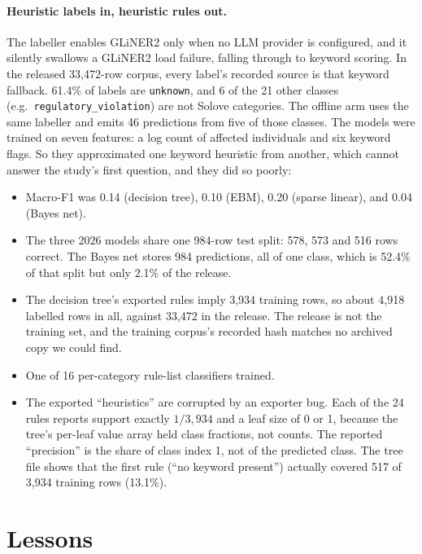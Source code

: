 \documentclass[10pt,twocolumn]{article}
\begin{document}
\paragraph{Heuristic labels in, heuristic rules out.} The labeller enables
GLiNER2 only when no LLM provider is configured, and it silently swallows a
GLiNER2 load failure, falling through to keyword scoring. In the released
33{,}472-row corpus, every label's recorded source is that keyword fallback.
61.4\% of labels are \texttt{unknown}, and 6 of the 21 other classes (e.g.\
\texttt{regulatory\_violation}) are not Solove categories. The offline arm uses
the same labeller and emits 46 predictions from five of those classes. The
models were trained on seven features: a log count of affected individuals and
six keyword flags. So they approximated one keyword heuristic from another,
which cannot answer the study's first question, and they did so poorly:
\begin{itemize}
  \item Macro-F1 was 0.14 (decision tree), 0.10 (EBM), 0.20 (sparse linear),
        and 0.04 (Bayes net).
  \item The three 2026 models share one 984-row test split: 578, 573 and 516
        rows correct. The Bayes net stores 984 predictions, all of one class,
        which is 52.4\% of that split but only 2.1\% of the release.
  \item The decision tree's exported rules imply 3{,}934 training rows, so
        about 4{,}918 labelled rows in all, against 33{,}472 in the release.
        The release is not the training set, and the training corpus's
        recorded hash matches no archived copy we could find.
  \item One of 16 per-category rule-list classifiers trained.
  \item The exported ``heuristics'' are corrupted by an exporter bug. Each of
        the 24 rules reports support exactly $1/3{,}934$ and a leaf size of 0
        or 1, because the tree's per-leaf value array held class fractions,
        not counts. The reported ``precision'' is the share of class index 1,
        not of the predicted class. The tree file shows that the first rule
        (``no keyword present'') actually covered 517 of 3{,}934 training rows
        (13.1\%).
\end{itemize}

\section{Lessons}
\label{sec:lessons}
\end{document}
